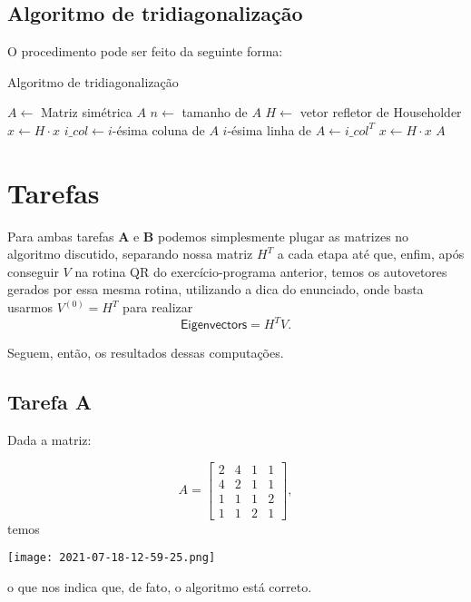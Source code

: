 \documentclass[
	12pt,				%
	openright,			%
	twoside,			%
	a4paper,			%
	]{abntex2}
\begin{document}
\section{Algoritmo de tridiagonalização}

O procedimento pode ser feito da seguinte forma:

\begin{algorithm}
\caption{Algoritmo de tridiagonalização}\label{euclid}
\begin{algorithmic}[1]
\State $A \gets$ Matriz simétrica $A$
\State $n\gets$ tamanho de $A$
	\State $H\gets$ vetor refletor de Householder\footnotemark
		\State $x \gets H\cdot x$
	\EndFor
	\State $i\_col \gets i$-ésima coluna de $A$
	\State $i$-ésima linha de $A \gets i\_col^T$
		\State $x \gets H\cdot x$
	\EndFor
\EndFor
\Return $A$
\EndProcedure
\end{algorithmic}
\end{algorithm}



\chapter{Tarefas}

Para ambas tarefas \textbf{A} e \textbf{B} podemos simplesmente plugar as
matrizes no algoritmo discutido, separando nossa matriz $H^T$ a cada etapa até
que, enfim, após conseguir $V$ na rotina QR do exercício-programa anterior,
temos os autovetores gerados por essa mesma rotina, utilizando a dica do
enunciado, onde basta usarmos $V^{(0)}=H^T$ para realizar
\[ \textsf{Eigenvectors} = H^TV. \]

Seguem, então, os resultados dessas computações.

\section{Tarefa A}

Dada a matriz:

\[
A=\begin{bmatrix}
	2 & 4 & 1 & 1\\
	4 & 2 & 1 & 1\\
	1 & 1 & 1 & 2\\
	1 & 1 & 2 & 1
\end{bmatrix},
\]
temos
\begin{center}
	\texttt{[image: 2021-07-18-12-59-25.png]}
\end{center}
o que nos indica que, de fato, o algoritmo está correto.
\end{document}
